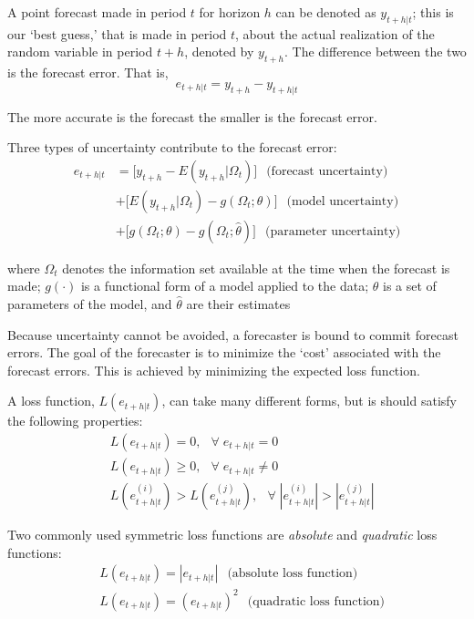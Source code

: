 \documentclass[
  12pt,
  oneside]{book}
\begin{document}
A point forecast made in period \(t\) for horizon \(h\) can be denoted as \(y_{t+h|t}\); this is our `best guess,' that is made in period \(t\), about the actual realization of the random variable in period \(t+h\), denoted by \(y_{t+h}\). The difference between the two is the forecast error. That is, \[e_{t+h|t} = y_{t+h} - y_{t+h|t}\]

The more accurate is the forecast the smaller is the forecast error.

Three types of uncertainty contribute to the forecast error:
\[\begin{aligned}
        e_{t+h|t} & = \big[y_{t+h}-E(y_{t+h}|\Omega_{t})\big]\;~~\text{(forecast uncertainty)}  \\
        & + \big[E(y_{t+h}|\Omega_{t}) - g(\Omega_{t};\theta)\big]\;~~\text{(model uncertainty)}  \\
        & + \big[g(\Omega_{t};\theta)-g(\Omega_{t};\hat{\theta})\big]\;~~\text{(parameter uncertainty)}
        \end{aligned}\]

where \(\Omega_t\) denotes the information set available at the time when the forecast is made; \(g(\cdot)\) is a functional form of a model applied to the data; \(\theta\) is a set of parameters of the model, and \(\hat{\theta}\) are their estimates

Because uncertainty cannot be avoided, a forecaster is bound to commit forecast errors. The goal of the forecaster is to minimize the `cost' associated with the forecast errors. This is achieved by minimizing the expected loss function.

A loss function, \(L(e_{t+h|t})\), can take many different forms, but is should satisfy the following properties:
\[\begin{aligned}
        & L(e_{t+h|t}) = 0,\;~~\forall\;e_{t+h|t} = 0 \\
        & L(e_{t+h|t}) \geq 0,\;~~\forall\;e_{t+h|t} \neq 0 \\
        & L(e_{t+h|t}^{(i)}) > L(e_{t+h|t}^{(j)}),\;~~\forall\;|e_{t+h|t}^{(i)}| > |e_{t+h|t}^{(j)}|
        \end{aligned}\]

Two commonly used symmetric loss functions are \emph{absolute} and \emph{quadratic} loss functions:
\[\begin{aligned}
        & L{(e_{t+h|t})} = |e_{t+h|t}|\;~~\text{(absolute loss function)} \\
        & L{(e_{t+h|t})} = (e_{t+h|t})^2\;~~\text{(quadratic loss function)}
        \end{aligned}\]
\end{document}
